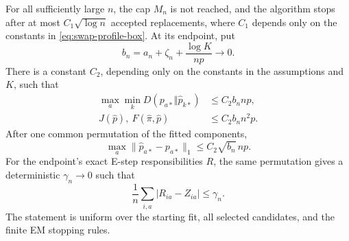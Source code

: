 \begin{lemma}
For all sufficiently large $n$, the cap $M_n$ is not reached, and the
algorithm stops after at most $C_1\sqrt{\log n}$ accepted replacements,
where $C_1$ depends only on the constants in
\eqref{eq:swap-profile-box}. At its endpoint, put
\[
 b_n=a_n+\zeta_n+\frac{\log K}{np}\longrightarrow0.
\]
There is a constant $C_2$, depending only on the constants in the
assumptions and $K$, such that
\begin{align}
 \max_a\min_kD(p_{a*}\Vert\widehat p_{k*})
   &\le C_2b_n np,
   \label{eq:swap-population-loss}\\
 J(\widehat p),\ F(\widehat\pi,\widehat p)
   &\le C_2b_n n^2p.
   \label{eq:swap-endpoint-cost}
\end{align}
After one common permutation of the fitted components,
\begin{equation}
 \max_a\|\widehat p_{a*}-p_{a*}\|_1
 \le C_2\sqrt{b_n}\,np.
 \label{eq:swap-center-matching}
\end{equation}
For the endpoint's exact E-step responsibilities $R$, the same
permutation gives a deterministic $\gamma_n\to0$ such that
\begin{equation}
 \frac1n\sum_{i,a}|R_{ia}-Z_{ia}|\le\gamma_n.
 \label{eq:swap-weak-responsibilities}
\end{equation}
The statement is uniform over the starting fit, all selected candidates,
and the finite EM stopping rules.
\end{lemma}

